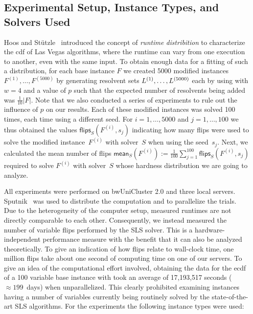 


\subsection{Experimental Setup, Instance Types, and Solvers Used}





Hoos and Stützle~\cite{HS98EvaluatingLasVegas} introduced the concept of \emph{runtime distribition} to characterize the cdf of Las Vegas algorithms, where the runtime can vary from one execution to another, even with the same input.
To obtain enough data for a fitting of such a distribution, for each base instance $F$ we created 5000 modified instances $F^{(1)}, \dots, F^{(5000)}$ by generating resolvent sets $L^{(1)}, \dots, L^{(5000)}$ %
each by using  with $w=4$ and a value of $p$ such that the expected number of resolvents being added was $\frac{1}{10} |F|$.
Note that we also conducted a series of experiments to rule out the influence of $p$ on our results.
Each of these modified instances was solved 100 times, each time using a different seed.
For $i = 1, \dots, 5000$ and $j = 1, \dots, 100$ we thus obtained the values $\mathsf{flips}_{S}(F^{(i)}, s_j)$
indicating how many flips were used to solve the modified instance~$F^{(i)}$ with solver~$S$ when using the seed~$s_j$.
Next, we calculated the mean number of flips $\mathsf{mean}_S(F^{(i)}) := \frac{1}{100} \sum_{j=1}^{100} \mathsf{flips}_{S}(F^{(i)}, s_j)$ required to solve $F^{(i)}$ with solver~$S$ whose hardness distribution we are going to analyze.


All experiments were performed on bwUniCluster 2.0 and 
three 
local servers.
Sputnik~\cite{VLSKK15Sputnik} was used to distribute the computation and to parallelize 
the 
trials.
Due to the heterogeneity of the 
computer 
setup, measured runtimes are not directly comparable to each other.
Consequently, we instead measured the number of variable flips performed by the SLS solver.
This is a hardware-independent performance measure with the benefit that it can also be analyzed 
theoretically.
To give an indication of how flips relate to wall-clock time, 
one million flips take about one second of computing time on one of our servers.
To give an idea of the computational effort involved, obtaining
the data for the ecdf of a 100 variable base instance with \SRWA{} took an average of 17,193,517 seconds ($\approx 199$~days) when unparallelized.
This clearly prohibited examining instances having a number of variables currently being routinely solved by the state-of-the-art SLS algorithms.
For the experiments the following instance types were used:

